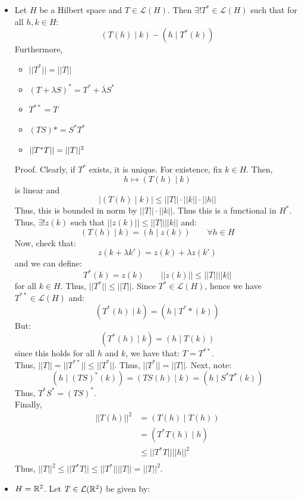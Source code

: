\documentclass[12pt]{article}
\begin{document}
\begin{itemize}
\begin{align*}
        &= (h \mid L_{A^*}(k))
    \end{align*}
    Gien $T \in \mathcal L(\F^n)$. Then, $\exists! T^* \in \mathcal L(\F^n)$ such that:
    \[ (T(h) \mid k) = (h \mid T^*(k))\]
    \item[Thmn.] Let $H$ be a Hilbert space and $T \in \mathcal L(H)$. Then $\exists! T^* \in \mathcal L (H)$ such that for all $h, k \in H$: 
    \[ (T(h) \mid k) - (h \mid T^*(k)) \]
    Furthermore, 
    \begin{itemize}
        \item $||T^*|| = ||T||$
        \item $(T+\lambda S)^* = T^* + \overline{\lambda} S^*$
        \item $T^{**} = T$
        \item $(TS)* = S^*T^*$
        \item $\left\vert\left\vert T^*T\right\vert\right\vert = ||T||^2$
    \end{itemize}
    Proof. Clearly, if $T^*$ exists, it is unique. For existence, fix $k \in H$. Then, 
    \[ h \mapsto (T(h) \mid k)\]
    is linear and 
    \[ |(T(h)\mid k)| \leq ||T|| \cdot ||k|| \cdot ||h||\]
    Thus, this is bounded in norm by $||T|| \cdot ||k||$. Thus this is a functional in $H^*$. Thus, $\exists! z(k)$ such that $||z(k)|| \leq ||T||||k||$ and: 
    \[ (T(h) \mid k) = (h \mid z(k)) \qquad \forall h \in H\]
    Now, check that: 
    \[ z(k+\lambda k') = z(k) + \lambda z(k') \] 
    and we can define: 
    \[ T^*(k) = z(k) \qquad ||z(k)|| \leq ||T||||k||\]
    for all $k \in H$. Thus, $||T^*|| \leq ||T||$. \bbni
    Since $T^* \in \mathcal L (H)$, hence we have $T^{**} \in \mathcal L(H)$ and: 
    \[ (T^*(h) \mid k) = (h \mid T^**(k))\]
    But:
    \[ (T^*(h) \mid k) = (h \mid T(k))\]
    since this holds for all $h$ and $k$, we have that: $T = T^{**}$. \\
    Thus, $||T|| = ||T^{**}|| \leq ||T^*||$. Thus, $||T^*|| = ||T||$. \bbni 
    Next, note: 
    \[ (h \mid (TS)^*(k)) = (TS(h) \mid k) = (h \mid S^*T^*(k)) \]
    Thus, $T^*S^* = (TS)^*$. \\
    Finally, 
    \begin{align*}
        ||T(h)||^2 &= (T(h) \mid T(h))  \\
        &= (T^*T(h) \mid h) \\
        &\leq ||T^*T|| ||h||^2 \\
    \end{align*}
    Thus, $||T||^2 \leq ||T^*T|| \leq ||T^*||||T|| = ||T||^2$. 
    \item[Ex.] $H = \mathbb R^2$. Let $T \in \mathcal{L}(\mathbb R^2)$ be given by: 

\end{itemize}
\end{document}
